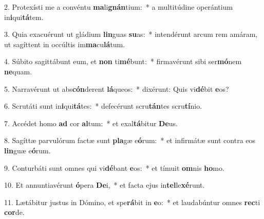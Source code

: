 2. Protexísti me a convéntu \textbf{ma}li\textbf{gnán}tium:~*  a multitúdine operántium in\textbf{i}qui\textbf{tá}tem.\

3. Quia exacuérunt ut gládium \textbf{lin}guas \textbf{su}as:~*  intendérunt arcum rem amáram, ut sagíttent in occúltis im\textbf{ma}cu\textbf{lá}tum.\

4. Súbito sagittábunt eum, et \textbf{non} ti\textbf{mé}bunt:~*  firmavérunt sibi ser\textbf{mó}nem \textbf{ne}quam.\

5. Narravérunt ut abs\textbf{cón}derent \textbf{lá}queos:~*  dixérunt: Quis vi\textbf{dé}bit \textbf{e}os?\

6. Scrutáti sunt in\textbf{i}qui\textbf{tá}tes:~*  defecérunt scru\textbf{tán}tes scru\textbf{tí}nio.\

7. Accédet homo \textbf{ad} cor \textbf{al}tum:~*  et exal\textbf{tá}bitur \textbf{De}us.\

8. Sagíttæ parvulórum factæ sunt \textbf{pla}gæ e\textbf{ó}rum:~*  et infirmátæ sunt contra eos \textbf{lin}guæ e\textbf{ó}rum.\

9. Conturbáti sunt omnes qui vi\textbf{dé}bant \textbf{e}os:~*  et tímuit \textbf{om}nis \textbf{ho}mo.\

10. Et annuntiavérunt \textbf{ó}pera \textbf{De}i,~*  et facta ejus in\textbf{tel}le\textbf{xé}runt.\

11. Lætábitur justus in Dómino, et spe\textbf{rá}bit in \textbf{e}o:~*  et laudabúntur omnes \textbf{rec}ti \textbf{cor}de.\

